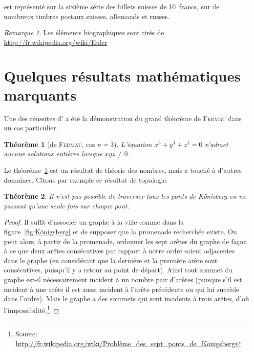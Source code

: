 \documentclass[a4paper,11pt]{article}
\theoremstyle{plain}
\newtheorem{thm}{Théorème}[section]
\theoremstyle{definition}
\theoremstyle{remark}
\newtheorem*{rmk}{Remarque}
\newcommand{\nom}[1]{\bsc{#1}\xspace}%
\newcommand{\euler}{\nom{Euler}}
\begin{document}
\euler est représenté sur la sixième série des billets suisses de 10~francs, sur de nombreux timbres postaux suisses, allemands et russes.

\begin{rmk}
Les éléments biographiques sont tirés de \url{http://fr.wikipedia.org/wiki/Euler}
\end{rmk}


 


\section{Quelques résultats mathématiques marquants}
Une des réussites d'\euler a été la démonstration du grand théorème de \textsc{Fermat} dans un cas particulier.

\begin{thm}[de \textsc{Fermat}, cas $n=3$]\label{theoreme.I}
L'équation $x^3 + y^3 + z^3 = 0$ n'admet aucune solutions entières lorsque $xyz \neq 0$.
\end{thm}

Le théorème~\ref{theoreme.I} est un résultat de théorie des nombres, mais \euler a touché à d'autres domaines. Citons par exemple ce résultat de topologie.

\begin{thm}
Il n'est pas possible de traverser tous les ponts de Könisberg en ne passant qu'une seule fois sur chaque pont.
\end{thm}

\begin{proof}
Il suffit d'associer un graphe à la ville comme dans la figure~\ref{fig:Königsberg} et de supposer que la promenade recherchée existe. 
On peut alors, à partir de la promenade, ordonner les sept arêtes du graphe de façon à ce que deux arêtes consécutives par rapport à notre ordre soient adjacentes dans le graphe (en considérant que la dernière et la première arête sont consécutives, puisqu'il y a retour au point de départ). 
Ainsi tout sommet du graphe est-il nécessairement incident à un nombre pair d'arêtes (puisque s'il est incident à une arête il est aussi incident à l'arête précédente ou qui lui succède dans l'ordre). 
Mais le graphe a des sommets qui sont incidents à trois arêtes, d'où l'impossibilité.\footnote{Source: \url{http://fr.wikipedia.org/wiki/Problème_des_sept_ponts_de_Königsberg}}
\end{proof}
\end{document}
